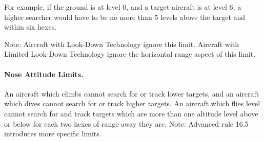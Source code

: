 {For example, if the ground is at level 0, and a target aircraft is at level 6, a higher searcher would have to be no more than 5 levels above the target and within six hexes.

Note: Aircraft with Look-Down Technology ignore this limit. Aircraft with Limited Look-Down Technology ignore the horizontal range aspect of this limit.

\paragraph{Nose Attitude Limits.} An aircraft which climbs cannot search for or track lower targets, and an aircraft which dives cannot search for or track higher targets. An aircraft which flies level cannot search for and track targets which are more than one altitude level above or below for each two hexes of range away they are. Note: Advanced rule 16.5 introduces more specific limits.
}

